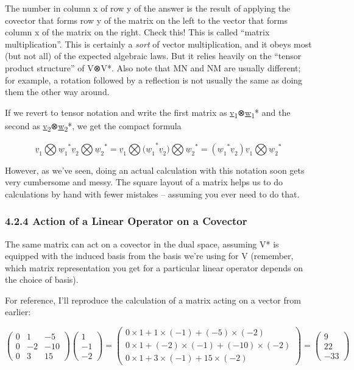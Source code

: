 \documentclass[oneside,english]{amsbook}
\numberwithin{section}{chapter}
\theoremstyle{plain}
\theoremstyle{definition}
\begin{document}
The number in column x of row y of the answer is the result of applying
the covector that forms row y of the matrix on the left to the vector
that forms column x of the matrix on the right. Check this! This is
called ``matrix multiplication''. This is certainly a \emph{sort} of
vector multiplication, and it obeys most (but not all) of the expected
algebraic laws. But it relies heavily on the ``tensor product
structure'' of V⊗V*. Also note that MN and NM are usually different; for
example, a rotation followed by a reflection is not usually the same as
doing them the other way around.

If we revert to tensor notation and write the first matrix as
\ul{v}\textsubscript{1}⊗\ul{w}\textsubscript{1}* and the second as
\ul{v}\textsubscript{2}⊗\ul{w}\textsubscript{2}*, we get the compact
formula

\[{{\underline{v}}_{1}\bigotimes{{\underline{w}}_{1}}^{*}{\underline{v}}_{2}\bigotimes{{\underline{w}}_{2}}^{*} = {\underline{v}}_{1}\bigotimes{{(\underline{w}}_{1}}^{*}{\underline{v}}_{2})\bigotimes{{\underline{w}}_{2}}^{*}
}{= ({{\underline{w}}_{1}}^{*}{\underline{v}}_{2}){\underline{v}}_{1}\bigotimes{{\underline{w}}_{2}}^{*}}\]

However, as we've seen, doing an actual calculation with this notation
soon gets very cumbersome and messy. The square layout of a matrix helps
us to do calculations by hand with fewer mistakes -- assuming you ever
need to do that.

\subsubsection{4.2.4 Action of a Linear Operator on a
	Covector}\label{action-of-a-linear-operator-on-a-covector}

The same matrix can act on a covector in the dual space, assuming V* is
equipped with the induced basis from the basis we're using for V
(remember, which matrix representation you get for a particular linear
operator depends on the choice of basis).

For reference, I'll reproduce the calculation of a matrix acting on a
vector from earlier:

\[\begin{pmatrix}
	0 & 1 & - 5 \\
	0 & - 2 & - 10 \\
	0 & 3 & 15
\end{pmatrix}\begin{pmatrix}
	1 \\
	- 1 \\
	- 2
\end{pmatrix} = \begin{pmatrix}
	0 \times 1 + 1 \times ( - 1) + ( - 5) \times ( - 2) \\
	0 \times 1 + ( - 2) \times ( - 1) + ( - 10) \times ( - 2) \\
	0 \times 1 + 3 \times ( - 1) + 15 \times ( - 2)
\end{pmatrix} = \begin{pmatrix}
	9 \\
	22 \\
	- 33
\end{pmatrix}\]
\end{document}
